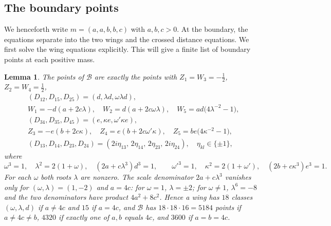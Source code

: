\documentclass[Threeside,11pt]{article}
\newtheorem{lemma}[theorem]{Lemma}
\theoremstyle{definition}
\theoremstyle{remark}
\numberwithin{equation}{section}
\theoremstyle{remark}
\begin{document}
\subsection{The boundary points}

{
We henceforth write $m=(a,a,b,b,c)$ with $a,b,c>0$.
At the boundary, the equations separate into the two wings and the crossed
distance equations.  We first solve the wing equations explicitly.  This
will give a finite list of boundary points at each positive mass.
}

{\begin{lemma}\label{d6-lem-atlas}
The points of $\mathcal B$ are exactly the points with $Z_1=W_3=-\frac12$, $Z_2=W_4=\frac12$,
\begin{gather*}
  (D_{12},D_{15},D_{25})=(d,\lambda d,\omega\lambda d),\\
  W_1=-d(a+2c\lambda),\quad
  W_2=d(a+2c\omega\lambda),\quad W_5=ad\bigl(4\lambda^{-2}-1\bigr),\\
  (D_{34},D_{35},D_{45})=(e,\kappa e,\omega'\kappa e),\\
  Z_3=-e(b+2c\kappa),\quad
  Z_4=e(b+2c\omega'\kappa),\quad Z_5=be\bigl(4\kappa^{-2}-1\bigr),\\
  (D_{13},D_{14},D_{23},D_{24})=(2i\eta_{13},\,2\eta_{14},\,2\eta_{23},\,2i\eta_{24}),\quad
  \eta_{kl}\in\{\pm1\},
\end{gather*}
where
\begin{equation*}
  \omega^3=1,\quad\lambda^2=2(1+\omega),\quad(2a+c\lambda^3)d^3=1,\qquad
  \omega'^3=1,\quad\kappa^2=2(1+\omega'),\quad(2b+c\kappa^3)e^3=1.
\end{equation*}
For each $\omega$ both roots $\lambda$ are nonzero.  The scale denominator $2a+c\lambda^3$
vanishes only for $(\omega,\lambda)=(1,-2)$ and $a=4c$: for $\omega=1$, $\lambda=\pm2$; for
$\omega\ne1$, $\lambda^6=-8$ and the two denominators have product $4a^2+8c^2$.  Hence a wing
has $18$ classes $(\omega,\lambda,d)$ if $a\ne4c$ and $15$ if $a=4c$, and $\mathcal B$ has
$18\cdot18\cdot16=5184$ points if $a\ne4c\ne b$, $4320$ if exactly one of $a,b$ equals $4c$, and
$3600$ if $a=b=4c$.
\end{lemma}}
\end{document}
